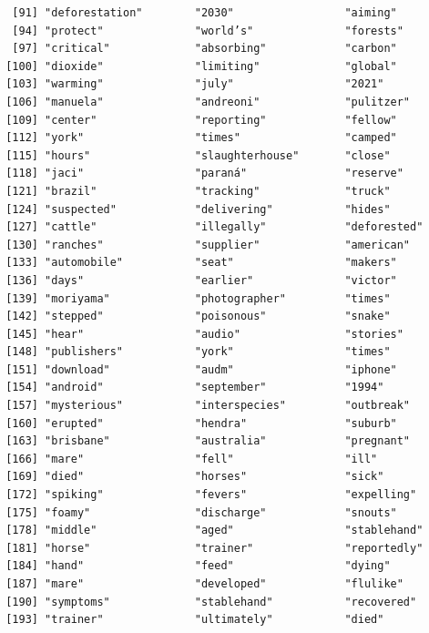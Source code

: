 \documentclass[
  letterpaper,
  DIV=11,
  numbers=noendperiod]{scrartcl}
\begin{document}
\begin{verbatim}
  [91] "deforestation"        "2030"                 "aiming"              
  [94] "protect"              "world’s"              "forests"             
  [97] "critical"             "absorbing"            "carbon"              
 [100] "dioxide"              "limiting"             "global"              
 [103] "warming"              "july"                 "2021"                
 [106] "manuela"              "andreoni"             "pulitzer"            
 [109] "center"               "reporting"            "fellow"              
 [112] "york"                 "times"                "camped"              
 [115] "hours"                "slaughterhouse"       "close"               
 [118] "jaci"                 "paraná"               "reserve"             
 [121] "brazil"               "tracking"             "truck"               
 [124] "suspected"            "delivering"           "hides"               
 [127] "cattle"               "illegally"            "deforested"          
 [130] "ranches"              "supplier"             "american"            
 [133] "automobile"           "seat"                 "makers"              
 [136] "days"                 "earlier"              "victor"              
 [139] "moriyama"             "photographer"         "times"               
 [142] "stepped"              "poisonous"            "snake"               
 [145] "hear"                 "audio"                "stories"             
 [148] "publishers"           "york"                 "times"               
 [151] "download"             "audm"                 "iphone"              
 [154] "android"              "september"            "1994"                
 [157] "mysterious"           "interspecies"         "outbreak"            
 [160] "erupted"              "hendra"               "suburb"              
 [163] "brisbane"             "australia"            "pregnant"            
 [166] "mare"                 "fell"                 "ill"                 
 [169] "died"                 "horses"               "sick"                
 [172] "spiking"              "fevers"               "expelling"           
 [175] "foamy"                "discharge"            "snouts"              
 [178] "middle"               "aged"                 "stablehand"          
 [181] "horse"                "trainer"              "reportedly"          
 [184] "hand"                 "feed"                 "dying"               
 [187] "mare"                 "developed"            "flulike"             
 [190] "symptoms"             "stablehand"           "recovered"           
 [193] "trainer"              "ultimately"           "died"                

\end{verbatim}
\end{document}
